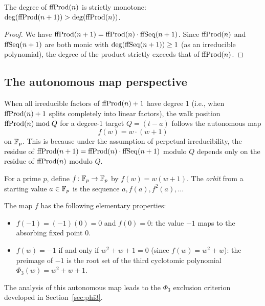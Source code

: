 \begin{proposition}\label{prop:degree-growth}
The degree of $\mathrm{ffProd}(n)$ is strictly monotone: $\deg(\mathrm{ffProd}(n+1)) >
\deg(\mathrm{ffProd}(n))$.
\end{proposition}

\begin{proof}
We have $\mathrm{ffProd}(n+1) = \mathrm{ffProd}(n) \cdot \mathrm{ffSeq}(n+1)$. Since $\mathrm{ffProd}(n)$
and $\mathrm{ffSeq}(n+1)$ are both monic with $\deg(\mathrm{ffSeq}(n+1)) \geq 1$ (as an
irreducible polynomial), the degree of the product strictly exceeds that
of $\mathrm{ffProd}(n)$.
\end{proof}

\subsection{The autonomous map perspective}

When all irreducible factors of $\mathrm{ffProd}(n)+1$ have degree 1 (i.e., when
$\mathrm{ffProd}(n)+1$ splits completely into linear factors), the walk position
$\mathrm{ffProd}(n) \bmod Q$ for a degree-1 target $Q = (t - a)$ follows the
autonomous map
\[
  f(w) = w \cdot (w + 1)
\]
on $\mathbb{F}_p$. This is because under the assumption of perpetual irreducibility,
the residue of $\mathrm{ffProd}(n+1) = \mathrm{ffProd}(n) \cdot \mathrm{ffSeq}(n+1)$ modulo $Q$
depends only on the residue of $\mathrm{ffProd}(n)$ modulo $Q$.

\begin{definition}\label{def:autonomous}
For a prime $p$, define $f \colon \mathbb{F}_p \to \mathbb{F}_p$ by $f(w) = w(w+1)$.
The \emph{orbit} from a starting value $a \in \mathbb{F}_p$ is the sequence
$a, f(a), f^2(a), \ldots$
\end{definition}

The map $f$ has the following elementary properties:
\begin{itemize}
  \item $f(-1) = (-1)(0) = 0$ and $f(0) = 0$: the value $-1$ maps to the
    absorbing fixed point $0$.
  \item $f(w) = -1$ if and only if $w^2 + w + 1 = 0$ (since $f(w) = w^2 + w$):
    the preimage of $-1$ is the root set of the third cyclotomic polynomial
    $\Phi_3(w) = w^2 + w + 1$.
\end{itemize}

The analysis of this autonomous map leads to the $\Phi_3$ exclusion criterion
developed in Section~\ref{sec:phi3}.
